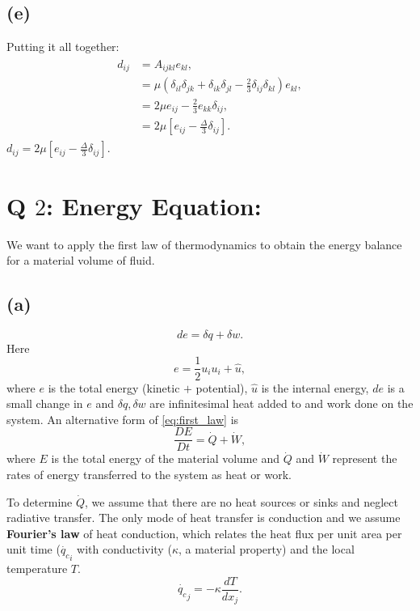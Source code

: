 \documentclass{article}
\begin{document}
\subsection*{(e)}
Putting it all together:
\begin{align}\label{eq:constitutive_relation}
 \begin{split}
  d_{ij} & = A_{ijkl} e_{kl},\\
  &= \mu \left(\delta_{il}\delta_{jk} + \delta_{ik}\delta_{jl} - \frac{2}{3}\delta_{ij}\delta_{kl} \right) e_{kl},\\
  & = 2\mu e_{ij} - \frac{2}{3} e_{kk} \delta_{ij},\\
  & = 2 \mu \left[e_{ij} - \frac{\Delta}{3} \delta_{ij} \right].  
 \end{split}
\end{align}
$\boxed{d_{ij} = 2 \mu \left[e_{ij} - \frac{\Delta}{3} \delta_{ij} \right]}$.

\section{Q $2$: Energy Equation:}
We want to apply the first law of thermodynamics to obtain the energy balance for a material volume of fluid.
\subsection*{(a)}
\begin{equation}\label{eq:first_law}
 de = \delta q + \delta w.
\end{equation}
Here
\begin{equation}
 e = \frac{1}{2}u_{i}u_{i} + \hat{u},
\end{equation}
where $e$ is the total energy (kinetic $+$ potential), $\hat{u}$ is the internal energy, $de$ is a small change in $e$ and  $\delta q, \delta w$ are infinitesimal heat added to and work done on the system. An alternative form of \ref{eq:first_law} is
\begin{equation}\label{eq:alternate_first_law}
 \frac{DE}{Dt} = \dot{Q} + \dot{W},
\end{equation}
where $E$ is the total energy of the material volume and $\dot{Q}$ and $\dot{W}$ represent the rates of energy transferred to the system as heat or work.   

To determine $\dot{Q}$, we assume that there are no heat sources or sinks and neglect radiative transfer. The only mode of heat transfer is conduction and we assume \textbf{Fourier's law} of heat conduction, which relates the heat flux per unit area per unit time ($\dot{q_{c}}_{i}$ with conductivity ($\kappa$, a material property) and the local temperature $T$. 
\begin{equation}\label{eq:Fourier_law}
 \dot{q_{c}}_{j} = - \kappa \frac{dT}{dx_{j}}.
\end{equation}
\end{document}
